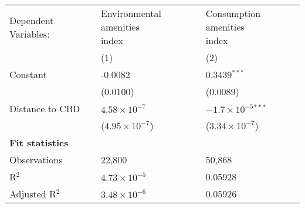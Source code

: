 \begin{table}[htbp]
   	\centering
   	\begin{tabular}{lll}
   		 \hline\hline
	      Dependent Variables: & \makecell[l]{Environmental amenities\\index}    & \makecell[l]{Consumption amenities\\index}\\   
	      		               & (1)                     & (2)\\  
	      \hline
		      Constant             & -0.0082                 & 0.3439$^{***}$\\   
					& (0.0100)                & (0.0089)\\   
			Distance to CBD          & $4.58\times 10^{-7}$    & $-1.7\times 10^{-5}$$^{***}$\\    
		& ($4.95\times 10^{-7}$)  & ($3.34\times 10^{-7}$)\\    
			\hline
			\textbf{Fit statistics}\\
      	Observations         & 22,800                  & 50,868\\  
		R$^2$                & $4.73\times 10^{-5}$    & 0.05928\\  
		Adjusted R$^2$       & $3.48\times 10^{-6}$    & 0.05926\\  
	      \hline\hline
   	\end{tabular}
\end{table}
